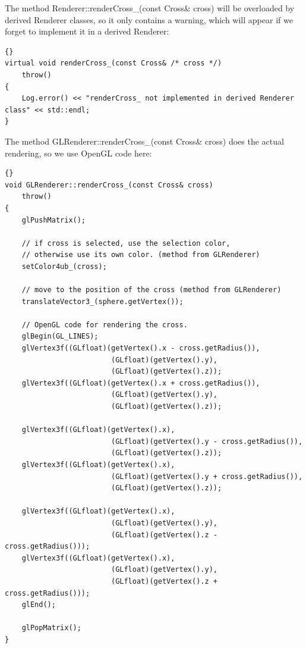 The method Renderer::renderCross\_(const Cross\& cross)
will be overloaded by derived Renderer classes, so it only
contains a warning, which will appear if we forget to 
implement it in a derived Renderer:

\begin{lstlisting}{}
virtual void renderCross_(const Cross& /* cross */)
	throw() 
{
	Log.error() << "renderCross_ not implemented in derived Renderer class" << std::endl;
}
\end{lstlisting}


The method GLRenderer::renderCross\_(const Cross\& cross)
does the actual rendering, so we use OpenGL code here:

\begin{lstlisting}{}
void GLRenderer::renderCross_(const Cross& cross)
	throw() 
{
	glPushMatrix();
	
	// if cross is selected, use the selection color,
	// otherwise use its own color. (method from GLRenderer)
	setColor4ub_(cross);  
	
	// move to the position of the cross (method from GLRenderer)
	translateVector3_(sphere.getVertex());
	
	// OpenGL code for rendering the cross.
	glBegin(GL_LINES);
	glVertex3f((GLfloat)(getVertex().x - cross.getRadius()),
						 (GLfloat)(getVertex().y),
						 (GLfloat)(getVertex().z));
	glVertex3f((GLfloat)(getVertex().x + cross.getRadius()),
						 (GLfloat)(getVertex().y),
						 (GLfloat)(getVertex().z));

	glVertex3f((GLfloat)(getVertex().x),
						 (GLfloat)(getVertex().y - cross.getRadius()),
						 (GLfloat)(getVertex().z));
	glVertex3f((GLfloat)(getVertex().x),
						 (GLfloat)(getVertex().y + cross.getRadius()),
						 (GLfloat)(getVertex().z));

	glVertex3f((GLfloat)(getVertex().x),
						 (GLfloat)(getVertex().y),
						 (GLfloat)(getVertex().z - cross.getRadius()));
	glVertex3f((GLfloat)(getVertex().x),
						 (GLfloat)(getVertex().y),
						 (GLfloat)(getVertex().z + cross.getRadius()));
	glEnd();

	glPopMatrix();
}
\end{lstlisting}



